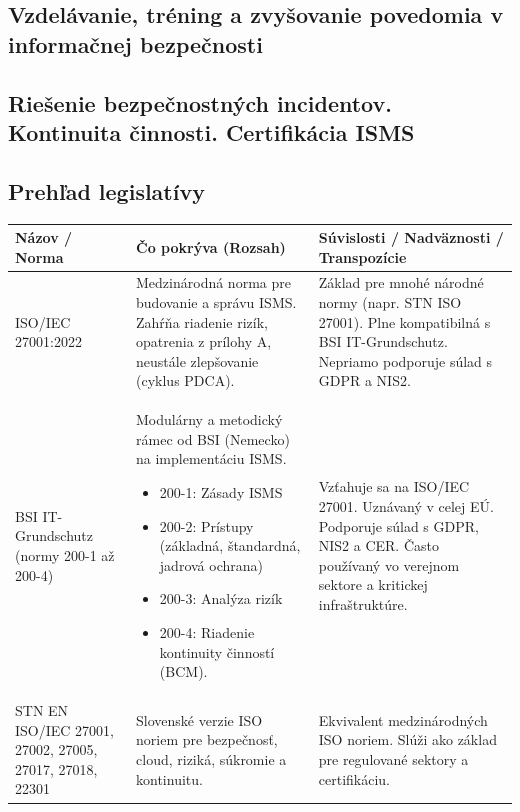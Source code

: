 \documentclass[12pt,a4paper]{article}
\begin{document}
{    \subsection{Vzdelávanie, tréning a zvyšovanie povedomia v informačnej bezpečnosti}
    \subsection{Riešenie bezpečnostných incidentov. Kontinuita činnosti. Certifikácia ISMS}

    \subsection*{Prehľad legislatívy}
    \begin{table}
    \centering
    \scriptsize
    \renewcommand{\arraystretch}{1.5}
    \begin{tabular}{|p{5cm}|p{8cm}|p{7cm}|}
    \hline
    \rowcolor[HTML]{C0C0C0}
    \textbf{Názov / Norma} & \textbf{Čo pokrýva (Rozsah)} & \textbf{Súvislosti / Nadväznosti / Transpozície} \\ \hline
    
    ISO/IEC 27001:2022 & Medzinárodná norma pre budovanie a správu ISMS. Zahŕňa riadenie rizík, opatrenia z prílohy A, neustále zlepšovanie (cyklus PDCA). & Základ pre mnohé národné normy (napr. STN ISO 27001). Plne kompatibilná s BSI IT-Grundschutz. Nepriamo podporuje súlad s GDPR a NIS2. \\ \hline
    
    BSI IT-Grundschutz (normy 200-1 až 200-4) & Modulárny a metodický rámec od BSI (Nemecko) na implementáciu ISMS.  \begin{itemize}
        \item 200-1: Zásady ISMS
        \item 200-2: Prístupy (základná, štandardná, jadrová ochrana)
        \item 200-3: Analýza rizík
        \item 200-4: Riadenie kontinuity činností (BCM).
    \end{itemize} & Vzťahuje sa na ISO/IEC 27001. Uznávaný v celej EÚ. Podporuje súlad s GDPR, NIS2 a CER. Často používaný vo verejnom sektore a kritickej infraštruktúre. \\ \hline
    
    STN EN ISO/IEC 27001, 27002, 27005, 27017, 27018, 22301 & Slovenské verzie ISO noriem pre bezpečnosť, cloud, riziká, súkromie a kontinuitu. & Ekvivalent medzinárodných ISO noriem. Slúži ako základ pre regulované sektory a certifikáciu. \\ \hline
    

\end{tabular}
\end{table}}
\end{document}
